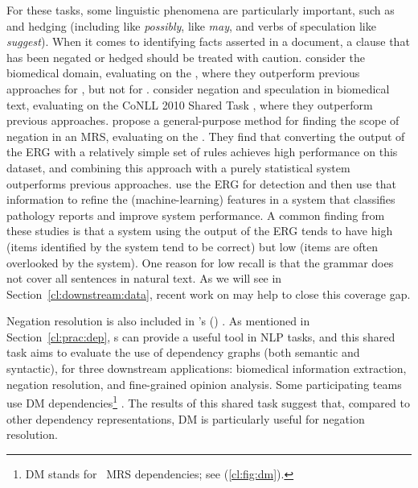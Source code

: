 \documentclass[output=paper,nonflat]{langsci/langscibook}
\begin{document}
For these tasks, some linguistic phenomena are particularly important,
such as  and hedging
(including  like \textit{possibly},  like \textit{may}, and verbs of speculation like \textit{suggest}).
When it comes to identifying facts asserted in a document,
a clause that has been negated or hedged should be treated with caution.
\citet{mackinlay2012biomed} consider the biomedical domain,
evaluating on the  \citep{kim2009task},
where they outperform previous approaches for , but not for .
\citet{velldal2012specneg} consider negation and speculation in biomedical text,
evaluating on the CoNLL 2010 Shared Task \citep{farkas2010task},
where they outperform previous approaches.
\citet{packard2014neg} propose a general-purpose method for finding the scope of negation in an MRS,
evaluating on the  \citep{morante2012task}.
They find that converting the output of the ERG with a relatively simple set of rules
achieves high performance on this  dataset,
and combining this approach with a purely statistical system
outperforms previous approaches.
\citet{zamaraeva2018pathology} use the ERG for  detection and then
use that information to refine the (machine-learning) features in a 
system that classifies  pathology reports and improve system performance.
A common finding from these studies
is that a system using the output of the ERG
tends to have high  (items identified by the system tend to be correct)
but low  (items are often overlooked by the system).
One reason for low recall is that the grammar does not cover all sentences in natural text.
As we will see in Section~\ref{cl:downstream:data},
recent work on  may help to close this coverage gap.

Negation resolution is also included in \citeauthor{oepen2017extrinsic}'s (\citeyear{oepen2017extrinsic})
.
As mentioned in Section~\ref{cl:prac:dep},
s can provide a useful tool in NLP tasks,
and this shared task aims to evaluate the use of dependency graphs (both semantic and syntactic),
for three downstream applications:
biomedical information extraction, negation resolution, and fine-grained opinion analysis.
Some participating teams use DM dependencies\footnote{DM stands for \delphin\ MRS dependencies; see (\ref{cl:fig:dm}).} \citep{schuster2017dep,chen2017dep}.
The results of this shared task suggest that,
compared to other dependency representations,
DM is particularly useful for negation resolution.
\end{document}
